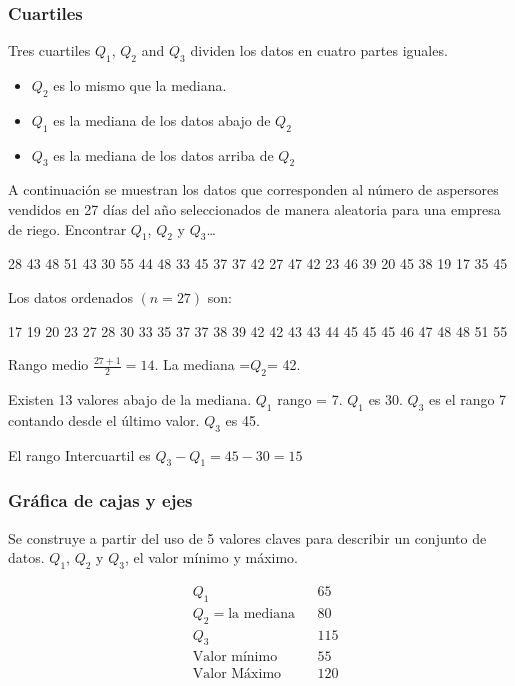 \subsubsection{Cuartiles}

Tres cuartiles $Q_1$, $Q_2$ and $Q_3$ dividen los datos en cuatro partes iguales.

\begin{itemize}
    \item $Q_2$ es lo mismo que la mediana.
    \item $Q_1$ es la mediana de los datos abajo de $Q_2$
    \item $Q_3$ es la mediana de los datos arriba de $Q_2$
\end{itemize}

A continuación se muestran los datos que
corresponden al número de aspersores vendidos en
27 días del año seleccionados de manera aleatoria
para una empresa de riego. Encontrar $Q_1$, $Q_2$ y $Q_3$\dots

28 43 48 51 43 30 55 44 48 33 45 37 37 42
27 47 42 23 46 39 20 45 38 19 17 35 45

Los datos ordenados $(n = 27)$ son:

17 19 20 23 27 28 30 33 35 37 37 38 39 42 42
43 43 44 45 45 45 46 47 48 48 51 55

Rango medio $\frac{27+1}{2} = 14$. La mediana =$Q_2$= 42.

Existen 13 valores abajo de la mediana.
$Q_1$ rango = 7. $Q_1$ es 30.
$Q_3$ es el rango 7 contando desde el último valor.
$Q_3$ es 45.

\begin{remark}
    El rango Intercuartil es $Q_3-Q_1=45-30=15$
\end{remark}

\subsubsection{ Gráfica de cajas y ejes}


Se construye a partir del uso de 5 valores claves para describir un
conjunto de datos. $Q_1$, $Q_2$ y $Q_3$, el valor mínimo y máximo.

\begin{align*}
     & Q_1                   &  & 65  \\
     & Q_2=\text{la mediana} &  & 80  \\
     & Q_3                   &  & 115 \\
     & \text{Valor mínimo}   &  & 55  \\
     & \text{Valor Máximo}   &  & 120
\end{align*}


